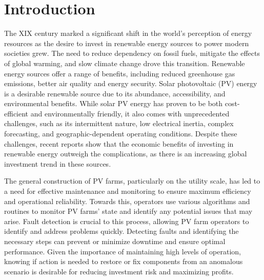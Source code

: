 \chapter{Introduction} \label{chap:chap1}


The XIX century marked a significant shift in the world's perception of energy resources as the desire to invest in renewable energy sources to power modern societies grew. The need to reduce dependency on fossil fuels, mitigate the effects of global warming, and slow climate change drove this transition. Renewable energy sources offer a range of benefits, including reduced greenhouse gas emissions, better air quality and energy security. Solar photovoltaic (PV) energy is a desirable renewable source due to its abundance, accessibility, and environmental benefits. While solar PV energy has proven to be both cost-efficient and environmentally friendly, it also comes with unprecedented challenges, such as its intermittent nature, low electrical inertia, complex forecasting, and geographic-dependent operating conditions. Despite these challenges, recent reports \cite{cap} show that the economic benefits of investing in renewable energy outweigh the complications, as there is an increasing global investment trend in these sources.

The general construction of PV farms, particularly on the utility scale, has led to a need for effective maintenance and monitoring to ensure maximum efficiency and operational reliability. Towards this, operators use various algorithms and routines to monitor PV farms' state and identify any potential issues that may arise. Fault detection is crucial to this process, allowing PV farm operators to identify and address problems quickly. Detecting faults and identifying the necessary steps can prevent or minimize downtime and ensure optimal performance. Given the importance of maintaining high levels of operation, knowing if action is needed to restore or fix components from an anomalous scenario is desirable for reducing investment risk and maximizing profits.

